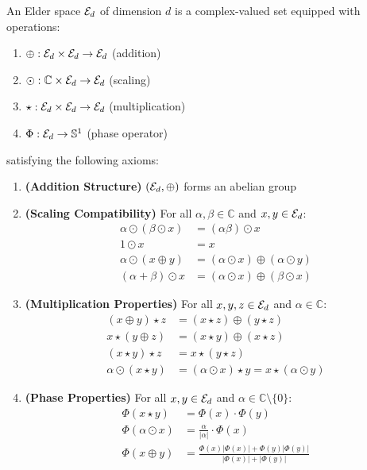\begin{definition}
An Elder space $\mathcal{E}_{d}$ of dimension $d$ is a complex-valued set equipped with operations:
\begin{enumerate}
    \item $\oplus: \mathcal{E}_{d} \times \mathcal{E}_{d} \rightarrow \mathcal{E}_{d}$ (addition)
    \item $\odot: \mathbb{C} \times \mathcal{E}_{d} \rightarrow \mathcal{E}_{d}$ (scaling)
    \item $\star: \mathcal{E}_{d} \times \mathcal{E}_{d} \rightarrow \mathcal{E}_{d}$ (multiplication)
    \item $\Phi: \mathcal{E}_{d} \rightarrow \mathbb{S}^1$ (phase operator)
\end{enumerate}
satisfying the following axioms:
\begin{enumerate}[label=\textbf{A\arabic*}]
    \item \textbf{(Addition Structure)} $(\mathcal{E}_{d}, \oplus)$ forms an abelian group
    \item \textbf{(Scaling Compatibility)} For all $\alpha, \beta \in \mathbb{C}$ and $x, y \in \mathcal{E}_{d}$:
    \begin{align}
        \alpha \odot (\beta \odot x) &= (\alpha\beta) \odot x\\
        1 \odot x &= x\\
        \alpha \odot (x \oplus y) &= (\alpha \odot x) \oplus (\alpha \odot y)\\
        (\alpha + \beta) \odot x &= (\alpha \odot x) \oplus (\beta \odot x)
    \end{align}
    
    \item \textbf{(Multiplication Properties)} For all $x, y, z \in \mathcal{E}_{d}$ and $\alpha \in \mathbb{C}$:
    \begin{align}
        (x \oplus y) \star z &= (x \star z) \oplus (y \star z)\\
        x \star (y \oplus z) &= (x \star y) \oplus (x \star z)\\
        (x \star y) \star z &= x \star (y \star z)\\
        \alpha \odot (x \star y) &= (\alpha \odot x) \star y = x \star (\alpha \odot y)
    \end{align}
    
    \item \textbf{(Phase Properties)} For all $x, y \in \mathcal{E}_{d}$ and $\alpha \in \mathbb{C} \setminus \{0\}$:
    \begin{align}
        \Phi(x \star y) &= \Phi(x) \cdot \Phi(y)\\
        \Phi(\alpha \odot x) &= \frac{\alpha}{|\alpha|} \cdot \Phi(x)\\
        \Phi(x \oplus y) &= \frac{\Phi(x)|\Phi(x)| + \Phi(y)|\Phi(y)|}{|\Phi(x)| + |\Phi(y)|}
    \end{align}
\end{enumerate}
\end{definition}


